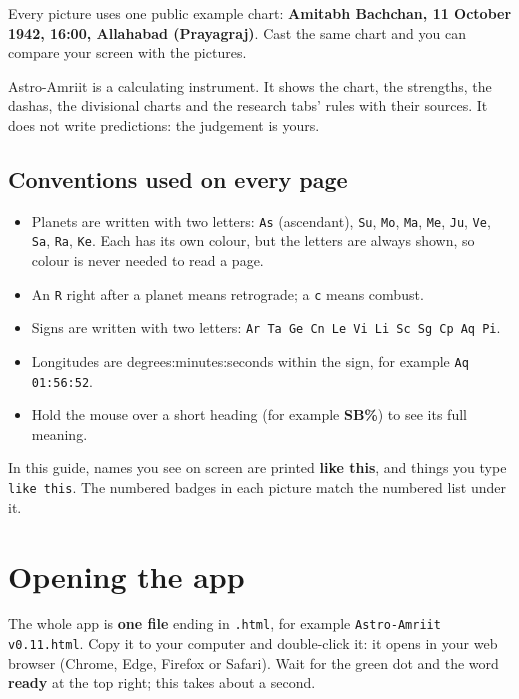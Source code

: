 \documentclass[11pt, a4paper]{article}
\newcommand{\app}{Astro-Amriit}
\newcommand{\ui}[1]{\textbf{\textsf{#1}}}   %
\newcommand{\ex}[1]{\texttt{#1}}             %
\begin{document}
Every picture uses one public example chart: \textbf{Amitabh Bachchan, 11 October 1942, 16:00,
Allahabad (Prayagraj)}. Cast the same chart and you can compare your screen with the pictures.

\begin{keybox}\kidea \app{} is a calculating instrument. It shows the chart, the strengths, the dashas,
the divisional charts and the research tabs' rules with their sources. It does not write predictions:
the judgement is yours.\end{keybox}

\subsection{Conventions used on every page}
\begin{itemize}[itemsep=2pt]
  \item Planets are written with two letters: \ex{As} (ascendant), \ex{Su}, \ex{Mo}, \ex{Ma}, \ex{Me},
        \ex{Ju}, \ex{Ve}, \ex{Sa}, \ex{Ra}, \ex{Ke}. Each has its own colour, but the letters are always
        shown, so colour is never needed to read a page.
  \item An \ex{R} right after a planet means retrograde; a \ex{c} means combust.
  \item Signs are written with two letters: \ex{Ar Ta Ge Cn Le Vi Li Sc Sg Cp Aq Pi}.
  \item Longitudes are degrees:minutes:seconds within the sign, for example \ex{Aq 01:56:52}.
  \item Hold the mouse over a short heading (for example \ui{SB\%}) to see its full meaning.
\end{itemize}

In this guide, names you see on screen are printed \ui{like this}, and things you type
\ex{like this}. The numbered badges in each picture match the numbered list under it.

\section{Opening the app}
\label{sec:open}
The whole app is \textbf{one file} ending in \ex{.html}, for example \ex{Astro-Amriit v0.11.html}.
Copy it to your computer and double-click it: it opens in your web browser (Chrome, Edge, Firefox or
Safari). Wait for the green dot and the word \ui{ready} at the top right; this takes about a second.
\end{document}
